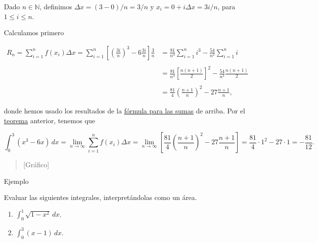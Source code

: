 \documentclass[
  letterpaper,
]{book}
\theoremstyle{plain}
\theoremstyle{remark}
\begin{document}
\begin{tcolorbox}[enhanced jigsaw, opacityback=0, left=2mm, opacitybacktitle=0.6, toprule=.15mm, bottomrule=.15mm, colbacktitle=quarto-callout-tip-color!10!white, titlerule=0mm, bottomtitle=1mm, title=\textcolor{quarto-callout-tip-color}{\faLightbulb}\hspace{0.5em}{Solución}, toptitle=1mm, colframe=quarto-callout-tip-color-frame, colback=white, breakable, rightrule=.15mm, arc=.35mm, leftrule=.75mm, coltitle=black]

Dado \(n\in\mathbb{N}\), definimos \(\Delta x=(3-0)/n=3/n\) y
\(x_i=0+i\Delta x=3i/n\), para \(1\leq i\leq n\).

Calculamos primero

\[
\begin{aligned}
R_n=\sum_{i=1}^n f(x_i)\Delta x=\sum_{i=1}^n \left[\left(\frac{3i}{n}\right)^3-6\frac{3i}{n}\right]\frac{3}{n}&=\frac{81}{n^4}\sum_{i=1}^n i^3-\frac{54}{n^2}\sum_{i=1}^n i\\
\\
&=\frac{81}{n^4} \left[\frac{n(n+1)}{2}\right]^2-\frac{54}{n^2}\frac{n(n+1)}{2}\\
\\
&=\frac{81}{4} \left(\frac{n+1}{n}\right)^2-27\frac{n+1}{n},
\end{aligned}
\]

donde hemos usado los resultados de la \hyperref[form-sumas]{fórmula
para las sumas} de arriba. Por el \hyperref[teo-puntosder]{teorema}
anterior, tenemos que

\[
\int_0^3 (x^3-6x)\,dx=\lim_{n\to \infty} \sum_{i=1}^n f(x_i)\Delta x= \lim_{n\to \infty} \left[\frac{81}{4} \left(\frac{n+1}{n}\right)^2-27\frac{n+1}{n}\right]=\frac{81}{4} \cdot 1^2-27\cdot 1=-\frac{81}{12}.
\]

\begin{quote}
{[}Gráfico{]}
\end{quote}

\end{tcolorbox}

Ejemplo

Evaluar las siguientes integrales, interpretándolas como un área.

\begin{enumerate}
\def\labelenumi{\arabic{enumi}.}
\item
  \(\displaystyle \int_0^1 \sqrt{1-x^2}\,dx\).
\item
  \(\displaystyle \int_0^3 (x-1)\,dx\).
\end{enumerate}
\end{document}
